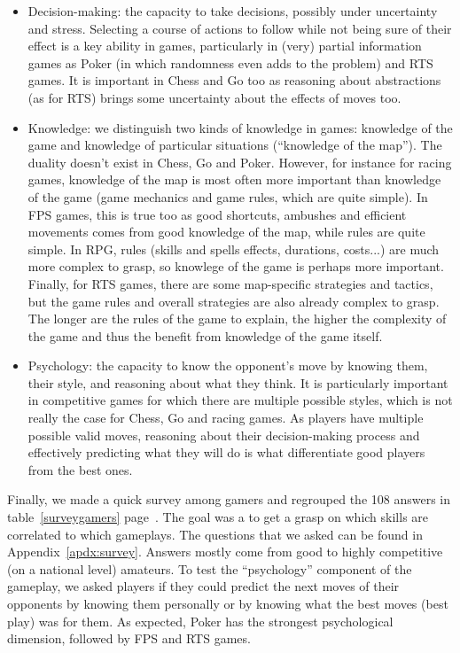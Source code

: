 \begin{itemize}
    \item Decision-making: the capacity to take decisions, possibly under uncertainty and stress. Selecting a course of actions to follow while not being sure of their effect is a key ability in games, particularly in (very) partial information games as Poker (in which randomness even adds to the problem) and RTS games. It is important in Chess and Go too as reasoning about abstractions (as for RTS) brings some uncertainty about the effects of moves too.
    \item Knowledge: we distinguish two kinds of knowledge in games: knowledge of the game and knowledge of particular situations (``knowledge of the map''). The duality doesn't exist in Chess, Go and Poker. However, for instance for racing games, knowledge of the map is most often more important than knowledge of the game (game mechanics and game rules, which are quite simple). In FPS games, this is true too as good shortcuts, ambushes and efficient movements comes from good knowledge of the map, while rules are quite simple. In RPG, rules (skills and spells effects, durations, costs...) are much more complex to grasp, so knowlege of the game is perhaps more important. Finally, for RTS games, there are some map-specific strategies and tactics, but the game rules and overall strategies are also already complex to grasp. The longer are the rules of the game to explain, the higher the complexity of the game and thus the benefit from knowledge of the game itself.
    \item Psychology: the capacity to know the opponent's move by knowing them, their style, and reasoning about what they think. It is particularly important in competitive games for which there are multiple possible styles, which is not really the case for Chess, Go and racing games. As players have multiple possible valid moves, reasoning about their decision-making process and effectively predicting what they will do is what differentiate good players from the best ones.
\end{itemize}

Finally, we made a quick survey among gamers and regrouped the 108 answers in table~\ref{surveygamers} page~\pageref{surveygamers}. The goal was a to get a grasp on which skills are correlated to which gameplays. The questions that we asked can be found in Appendix~\ref{apdx:survey}. Answers mostly come from good to highly competitive (on a national level) amateurs. To test the ``psychology'' component of the gameplay, we asked players if they could predict the next moves of their opponents by knowing them personally or by knowing what the best moves (best play) was for them. As expected, Poker has the strongest psychological dimension, followed by FPS and RTS games.
\\

